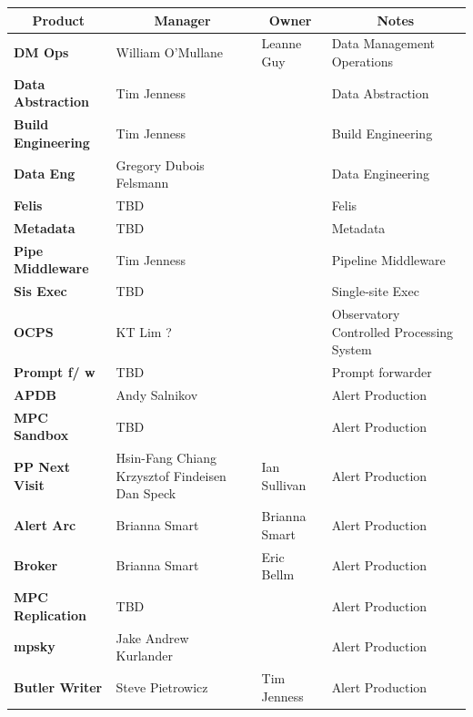 

\scriptsize
\begin{longtable} {
|p{}   |p{}|p{} |p{}|}
\multicolumn{1}{c|}{\textbf{Product}} &
\multicolumn{1}{c|}{\textbf{Manager}} &
\multicolumn{1}{c|}{\textbf{Owner}} &
\multicolumn{1}{c}{\textbf{Notes}}|\\ \hline
{\textbf{DM Ops}} & William O'Mullane & Leanne Guy & Data Management Operations \\ \hline
{\textbf{Data Abstraction}} & Tim Jenness &  & Data Abstraction \\ \hline
{\textbf{Build Engineering}} & Tim Jenness &  & Build Engineering \\ \hline
{\textbf{Data Eng}} & Gregory Dubois Felsmann &  & Data Engineering \\ \hline
{\textbf{Felis}} & TBD &  & Felis \\ \hline
{\textbf{Metadata}} & TBD &  & Metadata \\ \hline
{\textbf{Pipe Middleware}} & Tim Jenness &  & Pipeline Middleware \\ \hline
{\textbf{Sis Exec}} & TBD &  & Single-site Exec \\ \hline
{\textbf{OCPS}} & KT Lim ? &  & Observatory Controlled Processing System \\ \hline
{\textbf{Prompt f/ w}} & TBD &  & Prompt forwarder \\ \hline
{\textbf{APDB}} & Andy Salnikov &  & Alert Production \\ \hline
{\textbf{MPC Sandbox}} & TBD &  & Alert Production \\ \hline
{\textbf{PP Next Visit}} & Hsin-Fang Chiang
 Krzysztof Findeisen
 Dan Speck & Ian Sullivan & Alert Production \\ \hline
{\textbf{Alert Arc}} & Brianna Smart & Brianna Smart & Alert Production \\ \hline
{\textbf{Broker}} & Brianna Smart & Eric Bellm & Alert Production \\ \hline
{\textbf{MPC Replication}} & TBD &  & Alert Production \\ \hline
{\textbf{mpsky}} & Jake Andrew Kurlander &  & Alert Production \\ \hline
{\textbf{Butler Writer}} & Steve Pietrowicz & Tim Jenness & Alert Production \\ \hline

\end{longtable}
